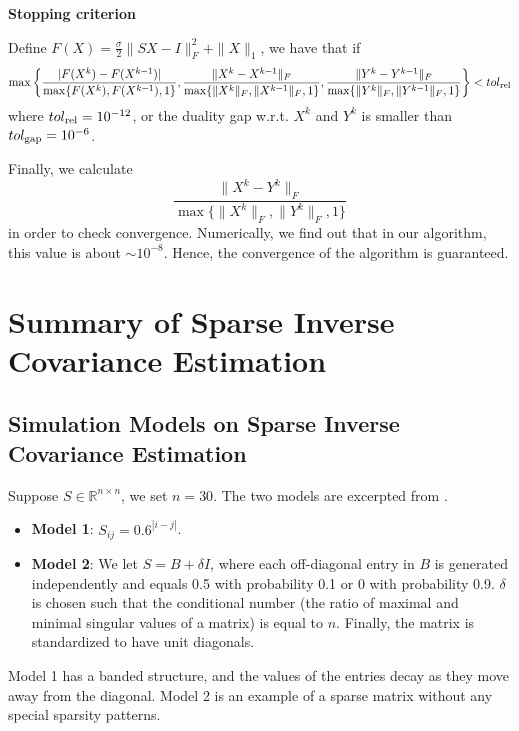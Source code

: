 \documentclass[conference,onecolumn,12pt]{IEEEtran}
\newcommand{\<}{\langle}
\renewcommand{\>}{\rangle}
\numberwithin{equation}{section}
\begin{document}
{\bf Stopping criterion}

Define $F(X)=\frac{\sigma}{2}\|SX-I\|_F^2+\|X\|_1$, we have that if 
\begin{equation}
    \max\left\{
        \frac{|F(X^k)-F(X^{k-1})|}{\max\{F(X^k),F(X^{k-1}),1\}},\frac{\|X^k-X^{k-1}\|_F}{\max\{\|X^k\|_F,\|X^{k-1}\|_F,1\}},\frac{\|Y^k-Y^{k-1}\|_F}{\max\{\|Y^k\|_F,\|Y^{k-1}\|_F,1\}}
    \right\} < tol_{\rm rel}
\end{equation}
where $tol_{\rm rel}=10^{-12}$, or the duality gap w.r.t. $X^k$ and $Y^k$ is smaller than $tol_{\rm gap}=10^{-6}$.

Finally, we calculate $$\frac{\|X^k-Y^k\|_F}{\max \{\|X^k\|_F,\|Y^k\|_F,1\}}$$ in order to check convergence. Numerically, we find out that in our algorithm, this value is about $\sim 10^{-8}$. Hence, the convergence of the algorithm is guaranteed.



\clearpage

\section{Summary of Sparse Inverse Covariance Estimation}
\subsection{Simulation Models on Sparse Inverse Covariance Estimation}
Suppose $S\in \mathbb{R}^{n\times n}$, we set $n=30$. The two models are excerpted from \cite{cai2011constrained}.
\begin{itemize}
    \item {\bf Model 1}: $S_{ij}=0.6^{|i-j|}$.
    \item {\bf Model 2}: We let $S=B+\delta I$, where each off-diagonal entry in $B$ is generated independently and equals 0.5 with probability 0.1 or 0 with probability 0.9. $\delta$ is chosen such that the conditional number (the ratio of maximal and minimal
    singular values of a matrix) is equal to $n$. Finally, the matrix is standardized to have unit diagonals.
\end{itemize}

Model 1 has a banded structure, and the values of the entries
decay as they move away from the diagonal. Model 2 is an example
of a sparse matrix without any special sparsity patterns. 
\end{document}
